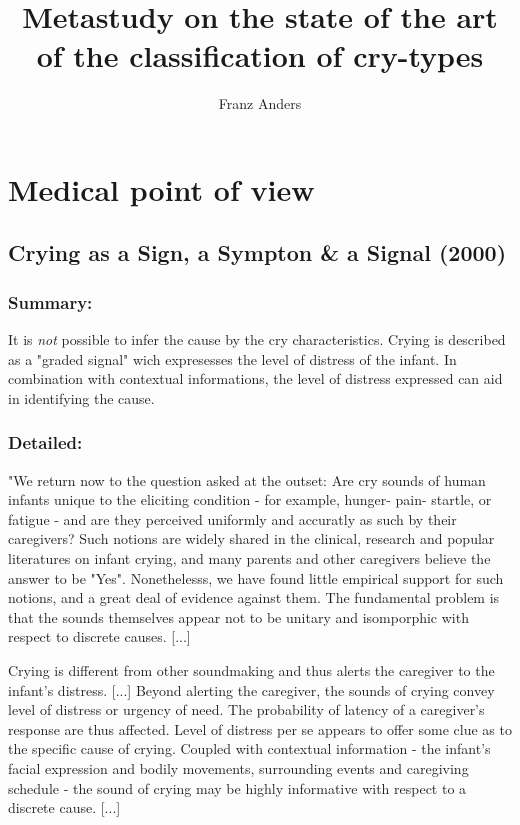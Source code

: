 \documentclass[11pt,twocolumn]{scrartcl}
\title{\textbf{Metastudy on the state of the art of the classification of cry-types}}
\author{Franz Anders}
\date{}
\begin{document}
\maketitle
\tableofcontents

\section{Medical point of view}

\subsection{Crying as a Sign, a Sympton \& a Signal (2000)}

\subsubsection*{Summary:} 

It is \emph{not} possible to infer the cause by the cry characteristics. Crying is described as a "graded signal" wich expresesses the level of distress of the infant. In combination with contextual informations, the level of distress expressed can aid in identifying the cause.\cite{Gustafson2000}


\subsubsection*{Detailed:}

"We return now to the question asked at the outset: Are cry sounds of human infants unique to the eliciting condition - for example, hunger- pain- startle, or fatigue - and are they perceived uniformly and accuratly as such by their caregivers? Such notions are widely shared in the clinical, research and popular literatures on infant crying, and many parents and other caregivers believe the answer to be "Yes".  Nonethelesss, we have found little empirical support for such notions, and a great deal of evidence against them. The fundamental problem is that the sounds themselves appear not to be unitary and isomporphic with respect to discrete causes. [...]

Crying is different from other soundmaking and thus alerts the caregiver to the infant's distress. [...] Beyond alerting the caregiver, the sounds of crying convey level of distress or urgency of need. The probability of latency of a caregiver's response are thus affected. Level of distress per se appears to offer some clue as to the specific cause of crying. Coupled with contextual information - the infant's facial expression and bodily movements, surrounding events and caregiving schedule - the sound of crying may be highly informative with respect to a discrete cause. [...]
\end{document}
